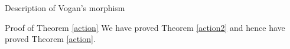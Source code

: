 \documentclass[a4paper,10pt]{amsart}
\begin{document}
\begin{section}{Description of Vogan's morphism}
\begin{subsection}{Proof of Theorem \ref{action}}
We have proved Theorem \ref{action2} and hence have proved Theorem \ref{action}.









\end{subsection}
\end{section}

{}

\end{document}
